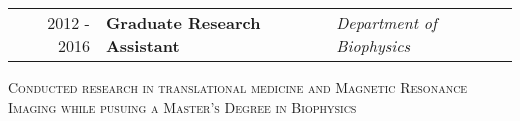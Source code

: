 

\begin{minipage}{\textwidth}
	\begin{tabular}{r|ll}
		2012 - 2016 & \textbf{Graduate Research Assistant} & \textit{Department of Biophysics}  \\
	\end{tabular}
\end{minipage}

\begin{center}
	\begin{minipage}{0.9\textwidth}
		\begin{center}
			\textsc{\Large Conducted research in translational medicine and Magnetic Resonance Imaging while pusuing a Master's Degree in Biophysics} \vspace{2mm}
		\end{center}
	\end{minipage}
\end{center}

